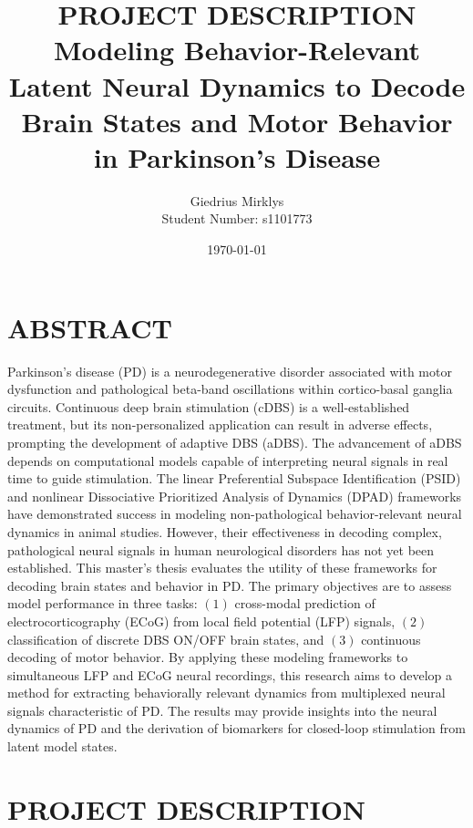 \documentclass[12pt, letterpaper]{article}
\begin{document}
\title{\textbf{PROJECT DESCRIPTION} \\ \vspace{1.5em} \large Modeling Behavior-Relevant Latent Neural Dynamics to Decode Brain States and Motor Behavior in Parkinson’s Disease}
\author{Giedrius Mirklys \\
    \normalsize{Student Number: s1101773}}
\date{\today} %

\maketitle
\RaggedRight


\section{ABSTRACT}
Parkinson’s disease (PD) is a neurodegenerative disorder associated with motor dysfunction and pathological beta-band oscillations within cortico-basal ganglia circuits. Continuous deep brain stimulation (cDBS) is a well-established treatment, but its non-personalized application can result in adverse effects, prompting the development of adaptive DBS (aDBS). The advancement of aDBS depends on computational models capable of interpreting neural signals in real time to guide stimulation. The linear Preferential Subspace Identification (PSID) and nonlinear Dissociative Prioritized Analysis of Dynamics (DPAD) frameworks have demonstrated success in modeling non-pathological behavior-relevant neural dynamics in animal studies. However, their effectiveness in decoding complex, pathological neural signals in human neurological disorders has not yet been established. This master’s thesis evaluates the utility of these frameworks for decoding brain states and behavior in PD. The primary objectives are to assess model performance in three tasks: $(1)$ cross-modal prediction of electrocorticography (ECoG) from local field potential (LFP) signals, $(2)$ classification of discrete DBS ON/OFF brain states, and $(3)$ continuous decoding of motor behavior. By applying these modeling frameworks to simultaneous LFP and ECoG neural recordings, this research aims to develop a method for extracting behaviorally relevant dynamics from multiplexed neural signals characteristic of PD. The results may provide insights into the neural dynamics of PD and the derivation of biomarkers for closed-loop stimulation from latent model states.

\section{PROJECT DESCRIPTION}
\end{document}

